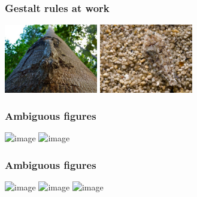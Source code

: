 \documentclass[]{beamer}
\begin{document}
\begin{frame}
 \frametitle{Gestalt rules at work}
\begin{center}
\includegraphics[height=30mm]{figs/l5/camouflage_similarity.jpg}
\includegraphics[height=30mm]{figs/l5/camouflage_similarity2.jpg}
\end{center}

\end{frame}



\begin{frame}
 \frametitle{Ambiguous figures}
\begin{overlayarea}{110mm}{85mm}
\begin{center}
\includegraphics<1>[width=70mm]{figs/l5/duck_rabbit.png}
\includegraphics<2->[width=65mm]{figs/l5/necker_cube.png}
\end{center}
\end{overlayarea}
\end{frame}



\begin{frame}
 \frametitle{Ambiguous figures}

\begin{center}
\includegraphics<1>[width=70mm]{figs/l5/duck_rabbit.png}
\includegraphics<2>[width=70mm]{figs/l5/necker_cube.png}
\includegraphics<3>[width=80mm]{figs/l5/accidental_viewpoint.png}
\end{center}
\end{frame}
\end{document}
